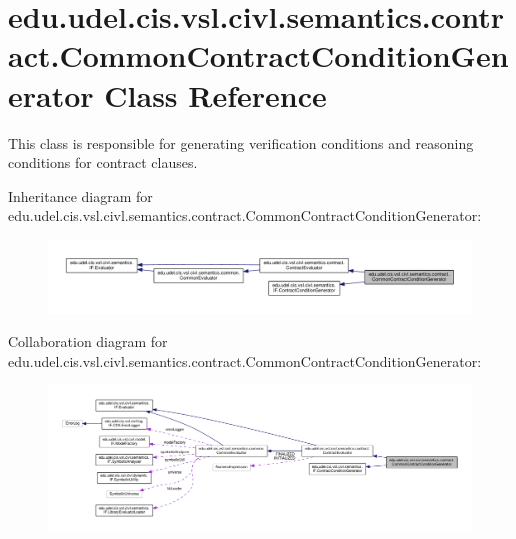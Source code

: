 \hypertarget{classedu_1_1udel_1_1cis_1_1vsl_1_1civl_1_1semantics_1_1contract_1_1CommonContractConditionGenerator}{}\section{edu.\+udel.\+cis.\+vsl.\+civl.\+semantics.\+contract.\+Common\+Contract\+Condition\+Generator Class Reference}
\label{classedu_1_1udel_1_1cis_1_1vsl_1_1civl_1_1semantics_1_1contract_1_1CommonContractConditionGenerator}


This class is responsible for generating verification conditions and reasoning conditions for contract clauses.  




Inheritance diagram for edu.\+udel.\+cis.\+vsl.\+civl.\+semantics.\+contract.\+Common\+Contract\+Condition\+Generator\+:
\nopagebreak
\begin{figure}[H]
\begin{center}
\leavevmode
\includegraphics[width=350pt]{classedu_1_1udel_1_1cis_1_1vsl_1_1civl_1_1semantics_1_1contract_1_1CommonContractConditionGenerator__inherit__graph}
\end{center}
\end{figure}


Collaboration diagram for edu.\+udel.\+cis.\+vsl.\+civl.\+semantics.\+contract.\+Common\+Contract\+Condition\+Generator\+:
\nopagebreak
\begin{figure}[H]
\begin{center}
\leavevmode
\includegraphics[width=350pt]{classedu_1_1udel_1_1cis_1_1vsl_1_1civl_1_1semantics_1_1contract_1_1CommonContractConditionGenerator__coll__graph}
\end{center}
\end{figure}
